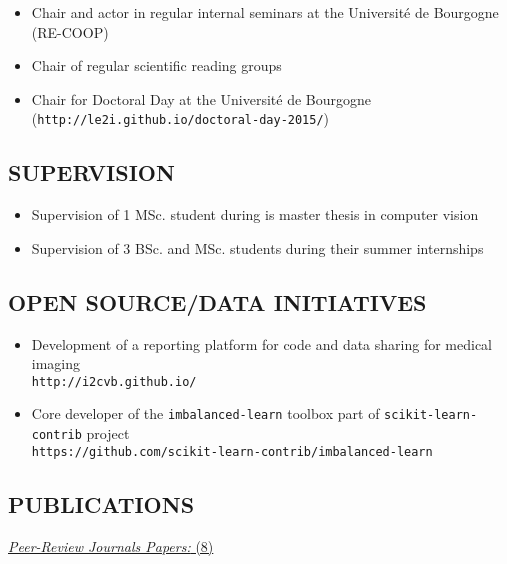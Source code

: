 {\begin{itemize}
\item Chair and actor in regular internal seminars at the Universit\'e de Bourgogne (RE-COOP)
\item Chair of regular scientific reading groups
\item Chair for Doctoral Day at the Universit\'e de Bourgogne (\texttt{http://le2i.github.io/doctoral-day-2015/})
\end{itemize}

\subsection{SUPERVISION}

\begin{itemize}
\item Supervision of 1 MSc. student during is master thesis in computer vision
\item Supervision of 3 BSc. and MSc. students during their summer internships
\end{itemize}


\subsection{OPEN SOURCE/DATA INITIATIVES}

\begin{itemize}
\item Development of a reporting platform for code and data sharing for medical imaging \\ \texttt{http://i2cvb.github.io/}
\item Core developer of the \texttt{imbalanced-learn} toolbox part of \texttt{scikit-learn-contrib} project \\ \texttt{https://github.com/scikit-learn-contrib/imbalanced-learn}
\end{itemize}

\subsection{PUBLICATIONS}

\underline{\textit{Peer-Review Journals Papers:} (8)}

\begin{enumerate}


\end{enumerate}}
